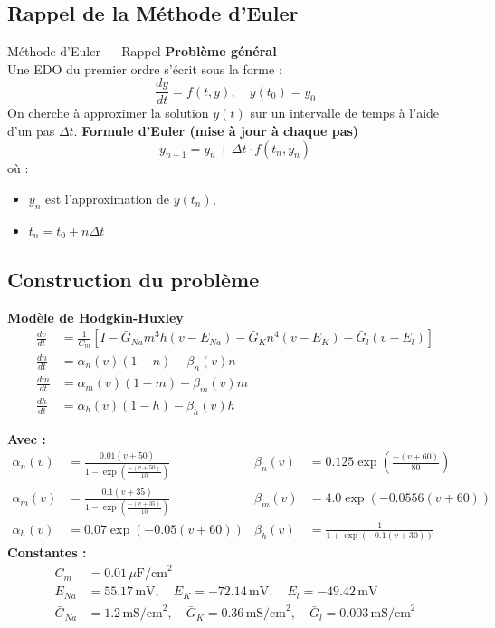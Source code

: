 \documentclass[10pt,french]{beamer}
\begin{document}
	\subsection{Rappel de la Méthode d’Euler}
	\begin{frame}{Méthode d’Euler — Rappel \cite{siciliano2012hodgkin}}
		\textbf{Problème général}\\
		Une EDO du premier ordre s’écrit sous la forme :
		\[
		\frac{dy}{dt} = f(t, y), \quad y(t_0) = y_0
		\]
		On cherche à approximer la solution $y(t)$ sur un intervalle de temps à l’aide d’un pas $\Delta t$.
		\vspace{0.5cm}
		\textbf{Formule d’Euler (mise à jour à chaque pas)}
		\[
		y_{n+1} = y_n + \Delta t \cdot f(t_n, y_n)
		\]
		où :
		\begin{itemize}
			\item $y_n$ est l’approximation de $y(t_n)$,
			\item $t_n = t_0 + n\Delta t$
		\end{itemize}
	\end{frame}
	
	\subsection{Construction du problème}
	\begin{frame}
		\textbf{Modèle de Hodgkin-Huxley} \\
		\begin{align*}
			\frac{dv}{dt} &= \frac{1}{C_m} \left[ I - \bar{G}_{Na} m^3 h (v - E_{Na}) - \bar{G}_K n^4 (v - E_K) - \bar{G}_l (v - E_l) \right] \\
			\frac{dn}{dt} &= \alpha_n(v)(1 - n) - \beta_n(v)n \\
			\frac{dm}{dt} &= \alpha_m(v)(1 - m) - \beta_m(v)m \\
			\frac{dh}{dt} &= \alpha_h(v)(1 - h) - \beta_h(v)h
		\end{align*}
	\end{frame}
	\begin{frame}
		\noindent \textbf{Avec :}
		\begin{align*}
			\alpha_n(v) &= \frac{0.01(v + 50)}{1 - \exp\left( \frac{-(v + 50)}{10} \right)} 
			&\beta_n(v) &= 0.125 \exp\left( \frac{-(v + 60)}{80} \right) \\
			\alpha_m(v) &= \frac{0.1(v + 35)}{1 - \exp\left( \frac{-(v + 35)}{10} \right)} 
			&\beta_m(v) &= 4.0 \exp\left( -0.0556(v + 60) \right) \\
			\alpha_h(v) &= 0.07 \exp\left( -0.05(v + 60) \right)
			&\beta_h(v) &= \frac{1}{1 + \exp(-0.1(v + 30))}
		\end{align*}
		\vspace{0.5em}
		\noindent \textbf{Constantes :}
		\begin{align*}
			C_m &= 0.01 \, \mu\text{F/cm}^2 \\
			E_{Na} &= 55.17 \, \text{mV}, \quad
			E_K = -72.14 \, \text{mV}, \quad
			E_l = -49.42 \, \text{mV} \\
			\bar{G}_{Na} &= 1.2 \, \text{mS/cm}^2, \quad
			\bar{G}_K = 0.36 \, \text{mS/cm}^2, \quad
			\bar{G}_l = 0.003 \, \text{mS/cm}^2
		\end{align*}
	\end{frame}
	
\end{document}
